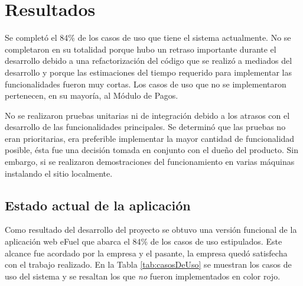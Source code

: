 \chapter{Resultados} \label{results}
Se completó el 84\% de los casos de uso que tiene el sistema actualmente. No se completaron en su totalidad porque hubo un retraso importante durante el desarrollo debido a una refactorización del código que se realizó a mediados del desarrollo y porque las estimaciones del tiempo requerido para implementar las funcionalidades fueron muy cortas. Los casos de uso que no se implementaron pertenecen, en su mayoría, al Módulo de Pagos.

No se realizaron pruebas unitarias ni de integración debido a los atrasos con el desarrollo de las funcionalidades principales. Se determinó que las pruebas no eran prioritarias, era preferible implementar la mayor cantidad de funcionalidad posible, ésta fue una decisión tomada en conjunto con el dueño del producto. Sin embargo, si se realizaron demostraciones del funcionamiento en varias máquinas instalando el sitio localmente.

\section{Estado actual de la aplicación}
Como resultado del desarrollo del proyecto se obtuvo una versión funcional de la aplicación web eFuel que abarca el 84\% de los casos de uso estipulados. Este alcance fue acordado por la empresa y el pasante, la empresa quedó satisfecha con el trabajo realizado. En la Tabla \ref{tab:casosDeUso} se muestran los casos de uso del sistema y se resaltan los que \emph{no} fueron implementados en color rojo.

\newcommand\usecasenumber{\stepcounter{usecasesrownumbers}\arabic{usecasesrownumbers}}

